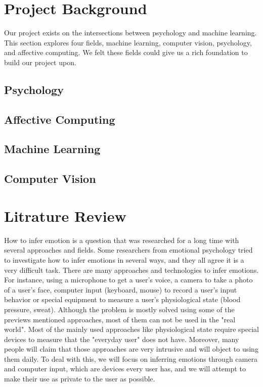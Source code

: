 \documentclass{article}
\begin{document}



\tableofcontents

\newpage

\section{Project Background}
Our project exists on the intersections between psychology and machine learning.
This section explores four fields, machine learning, computer vision, psychology, and affective computing.
We felt these fields could give us a rich foundation to build our project upon.


\subsection{Psychology}


\subsection{Affective Computing}


\subsection{Machine Learning}


\subsection{Computer Vision}  \label{section:cv}



\section{Litrature Review}
How to infer emotion is a question that was researched for a long time with several approaches and fields.
Some researchers from emotional psychology tried to investigate how to infer emotions in several ways, and they all agree
it is a very difficult task. There are many approaches and technologies to infer emotions.
For instance, using a microphone to get a user’s voice, a camera to take a photo of a user’s face, computer input (keyboard, mouse) to record a user’s
input behavior or special equipment to measure a user’s physiological state (blood pressure, sweat).
Although the problem is mostly solved using some of the previews mentioned approaches, most of them can not be used in the "real world".
Most of the mainly used approaches like physiological state require special devices to measure that the "everyday user" does not have.
Moreover, many people will claim that those approaches are very intrusive and will object to using them daily.
To deal with this, we will focus on inferring emotions through camera and computer input, which are devices every user has,
and we will attempt to make their use as private to the user as possible.
\end{document}
